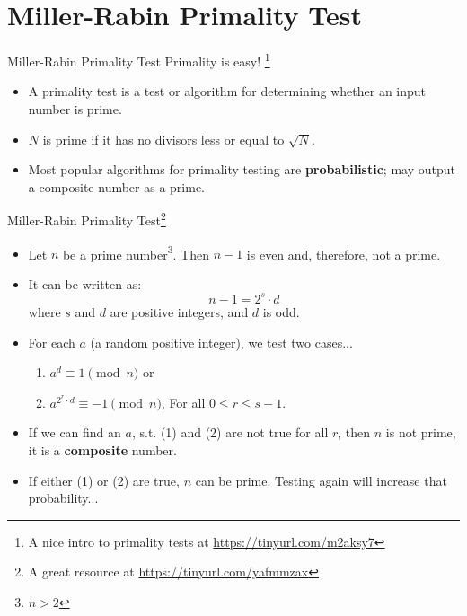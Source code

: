 \documentclass{beamer}
\begin{document}
\section{Miller-Rabin Primality Test}

\begin{frame}{Miller-Rabin Primality Test}
    Primality is easy! \footnote{A nice intro to primality tests at \url{https://tinyurl.com/m2aksy7}}
    \begin{itemize}
        \item A primality test is a test or algorithm for determining whether an input number is prime.
        \item $N$ is prime if it has no divisors less or equal to $\sqrt{N}$.
        \item Most popular algorithms for primality testing are \textbf{probabilistic}; may output a composite number as a prime.
    \end{itemize}
\end{frame}

\begin{frame}{Miller-Rabin Primality Test\footnote{A great resource at \url{https://tinyurl.com/yafmmzax}}}
    \begin{itemize}
        \item Let $n$ be a prime number\footnote{$n > 2$}. Then $n - 1$ is even and, therefore, not a prime.
        \item It can be written as:
            $$n - 1 = 2^{s} \cdot d$$
            where $s$ and $d$ are positive integers, and $d$ is odd. 
        \item For each $a$ (a random positive integer), we test two cases...
        \begin{enumerate}
            \item $a^{d} \equiv 1 \pmod n$ or    
            \item $a^{2^r \cdot d} \equiv -1 \pmod n$, {\scriptsize For all $0 \leq r \leq s - 1$.}
        \end{enumerate}
        \item If we can find an $a$, s.t. (1) and (2) are not true for all $r$, then $n$ is not prime, it is a \textbf{composite} number.
        \item If either (1) or (2) are true, $n$ can be prime. Testing again will increase that probability...
    \end{itemize}
\end{frame}
\end{document}
